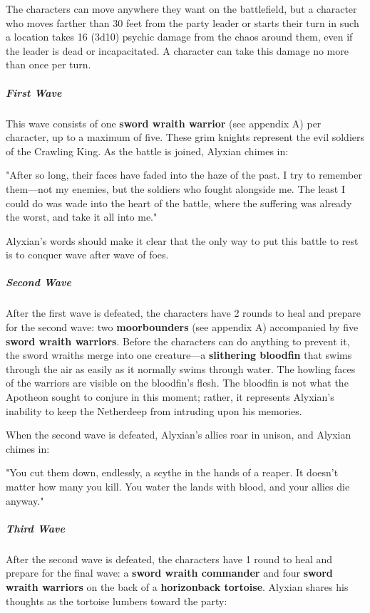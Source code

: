 \documentclass[10pt,a4paper,twoside,fancy,bg=print,twocolumn,openany,nodeprecatedcode]{dndbook}
\begin{document}
The characters can move anywhere they want on the battlefield, but a character who moves farther than 30 feet from the party leader or starts their turn in such a location takes 16 (3d10) psychic damage from the chaos around them, even if the leader is dead or incapacitated. A character can take this damage no more than once per turn.

\subparagraph{First Wave}
This wave consists of one \textbf{sword wraith warrior} (see appendix A) per character, up to a maximum of five. These grim knights represent the evil soldiers of the Crawling King. As the battle is joined, Alyxian chimes in:

\begin{DndReadAloud}{}
"After so long, their faces have faded into the haze of the past. I try to remember them—not my enemies, but the soldiers who fought alongside me. The least I could do was wade into the heart of the battle, where the suffering was already the worst, and take it all into me."

\end{DndReadAloud}

Alyxian's words should make it clear that the only way to put this battle to rest is to conquer wave after wave of foes.

\subparagraph{Second Wave}
After the first wave is defeated, the characters have 2 rounds to heal and prepare for the second wave: two \textbf{moorbounders} (see appendix A) accompanied by five \textbf{sword wraith warriors}. Before the characters can do anything to prevent it, the sword wraiths merge into one creature—a \textbf{slithering bloodfin} that swims through the air as easily as it normally swims through water. The howling faces of the warriors are visible on the bloodfin's flesh. The bloodfin is not what the Apotheon sought to conjure in this moment; rather, it represents Alyxian's inability to keep the Netherdeep from intruding upon his memories.

When the second wave is defeated, Alyxian's allies roar in unison, and Alyxian chimes in:

\begin{DndReadAloud}{}
"You cut them down, endlessly, a scythe in the hands of a reaper. It doesn't matter how many you kill. You water the lands with blood, and your allies die anyway."

\end{DndReadAloud}

\subparagraph{Third Wave}
After the second wave is defeated, the characters have 1 round to heal and prepare for the final wave: a \textbf{sword wraith commander} and four \textbf{sword wraith warriors} on the back of a \textbf{horizonback tortoise}. Alyxian shares his thoughts as the tortoise lumbers toward the party:
\end{document}
